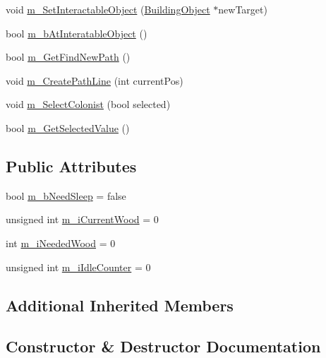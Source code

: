\begin{DoxyCompactItemize}
\item 
void \mbox{\hyperlink{class_colonist_a424fe6f992957fe97b1cc7008dfd9233}{m\+\_\+\+Set\+Interactable\+Object}} (\mbox{\hyperlink{class_building_object}{Building\+Object}} $\ast$new\+Target)
\item 
bool \mbox{\hyperlink{class_colonist_a7b5e8bd198ca9e077e9352908848e0a1}{m\+\_\+b\+At\+Interatable\+Object}} ()
\item 
bool \mbox{\hyperlink{class_colonist_a269c0b2ac4ebf5eb0fbf1286063765ff}{m\+\_\+\+Get\+Find\+New\+Path}} ()
\item 
void \mbox{\hyperlink{class_colonist_a4d5b1c31fff5922f67c8de7f5031fc5d}{m\+\_\+\+Create\+Path\+Line}} (int current\+Pos)
\item 
void \mbox{\hyperlink{class_colonist_abd0ac8d5315b88b193a0c288caa1e070}{m\+\_\+\+Select\+Colonist}} (bool selected)
\item 
bool \mbox{\hyperlink{class_colonist_ac2c3826ecc02ac228cb6c829a1ab2203}{m\+\_\+\+Get\+Selected\+Value}} ()
\end{DoxyCompactItemize}
\subsection*{Public Attributes}
\begin{DoxyCompactItemize}
\item 
bool \mbox{\hyperlink{class_colonist_a5521900ae5f26798f055c2b4a6261626}{m\+\_\+b\+Need\+Sleep}} = false
\item 
unsigned int \mbox{\hyperlink{class_colonist_a7d052b658e17e5571229eec7ae9471f7}{m\+\_\+i\+Current\+Wood}} = 0
\item 
int \mbox{\hyperlink{class_colonist_a835f8bfb0683d483f0c9ace75d9bcf59}{m\+\_\+i\+Needed\+Wood}} = 0
\item 
unsigned int \mbox{\hyperlink{class_colonist_abea3166ef031870e52518bfe83a2340b}{m\+\_\+i\+Idle\+Counter}} = 0
\end{DoxyCompactItemize}
\subsection*{Additional Inherited Members}


\subsection{Constructor \& Destructor Documentation}
\mbox{\label{class_colonist_a6666c1c45bd7f52b423357828eaef598}} 
